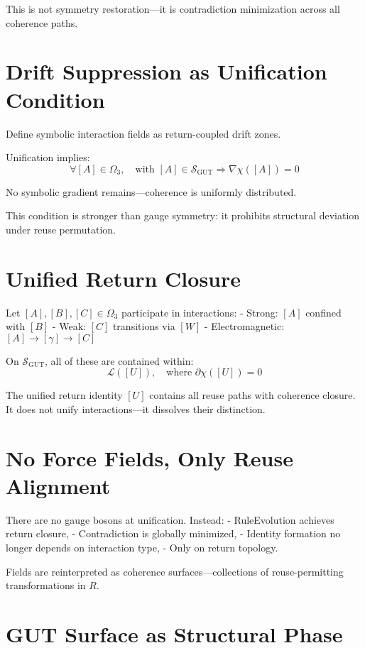 This is not symmetry restoration—it is contradiction minimization across all coherence paths.

\section{Drift Suppression as Unification Condition} \label{sec:gut-drift}

Define symbolic interaction fields as return-coupled drift zones.

Unification implies:
\[
\forall [A] \in \Omega_3,\quad \text{with } [A] \in \mathcal{S}_{\text{GUT}} \Rightarrow \nabla \chi([A]) = 0
\]

No symbolic gradient remains—coherence is uniformly distributed.

This condition is stronger than gauge symmetry: it prohibits structural deviation under reuse permutation.

\section{Unified Return Closure} \label{sec:gut-closure}

Let $[A], [B], [C] \in \Omega_3$ participate in interactions:
- Strong: $[A]$ confined with $[B]$
- Weak: $[C]$ transitions via $[W]$
- Electromagnetic: $[A] \to [\gamma] \to [C]$

On $\mathcal{S}_{\text{GUT}}$, all of these are contained within:
\[
\mathcal{L}([U]),\quad \text{where } \partial\chi([U]) = 0
\]

The unified return identity $[U]$ contains all reuse paths with coherence closure. It does not unify interactions—it dissolves their distinction.

\section{No Force Fields, Only Reuse Alignment} \label{sec:gut-no-fields}

There are no gauge bosons at unification. Instead:
- RuleEvolution achieves return closure,
- Contradiction is globally minimized,
- Identity formation no longer depends on interaction type,
- Only on return topology.

Fields are reinterpreted as coherence surfaces—collections of reuse-permitting transformations in $R$.

\section{GUT Surface as Structural Phase} \label{sec:gut-phase}

